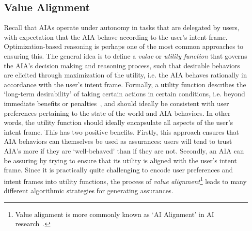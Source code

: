 

\subsection{Value Alignment} \label{sec:value_alignment}
Recall that AIAs operate under autonomy in tasks that are delegated by users, with expectation that the AIA behave according to the user's intent frame. 
Optimization-based reasoning is perhaps one of the most common approaches to ensuring this. 
The general idea is to define a \emph{value} or \emph{utility function} that governs the AIA's decision making and reasoning process, such that desirable behaviors are elicited through maximization of the utility, i.e. the AIA behaves rationally in accordance with the user's intent frame. 
Formally, a utility function describes the `long-term desirability' of taking certain actions in certain conditions, i.e. beyond immediate benefits or penalties~\cite{Russell2010-wv}, and should ideally be consistent with user preferences pertaining to the state of the world and AIA behaviors. 
In other words, the utility function should ideally encapsulate all aspects of the user's intent frame. 
This has two positive benefits. 
Firstly, this approach ensures that AIA behaviors can themselves be used as assurances: users will tend to trust AIA's more if they are `well-behaved' than if they are not. 
Secondly, an AIA can be assuring by trying to ensure that its utility is aligned with the user's intent frame.
Since it is practically quite challenging to encode user preferences and intent frames into utility functions, the process of \emph{value alignment}\footnote{Value alignment is more commonly known as `AI Alignment' in AI research~\cite{Yudkowsky2001-hb,Bensinger2014-ul}.} leads to many different algorithmic strategies for generating assurances. 

